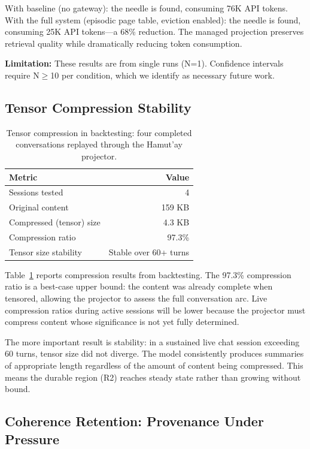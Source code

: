 \documentclass[sigplan,screen,anonymous]{acmart}
\begin{document}
With baseline (no gateway): the needle is found, consuming 76K API
tokens. With the full system (episodic page table, eviction enabled):
the needle is found, consuming 25K API tokens---a 68\% reduction.
The managed projection preserves retrieval quality while dramatically
reducing token consumption.

\textbf{Limitation:} These results are from single runs (N=1).
Confidence intervals require N$\geq$10 per condition, which we
identify as necessary future work.

\subsection{Tensor Compression Stability}

\begin{table}[t]
\centering
\caption{Tensor compression in backtesting: four completed
  conversations replayed through the Hamut'ay projector.}
\label{tab:compression}
\begin{tabular}{lr}
\toprule
Metric & Value \\
\midrule
Sessions tested & 4 \\
Original content & 159 KB \\
Compressed (tensor) size & 4.3 KB \\
Compression ratio & 97.3\% \\
Tensor size stability & Stable over 60+ turns \\
\bottomrule
\end{tabular}
\end{table}

Table~\ref{tab:compression} reports compression results from
backtesting. The 97.3\% compression ratio is a best-case upper bound:
the content was already complete when tensored, allowing the projector
to assess the full conversation arc. Live compression ratios during
active sessions will be lower because the projector must compress
content whose significance is not yet fully determined.

The more important result is stability: in a sustained live chat
session exceeding 60 turns, tensor size did not diverge. The model
consistently produces summaries of appropriate length regardless of
the amount of content being compressed. This means the durable region
(R2) reaches steady state rather than growing without bound.

\subsection{Coherence Retention: Provenance Under Pressure}
\label{sec:cr-eval}
\end{document}
